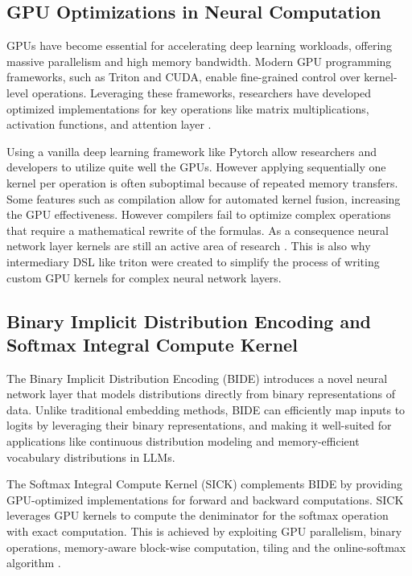 \documentclass{article}
\begin{document}
\subsection{GPU Optimizations in Neural Computation}
GPUs have become essential for accelerating deep learning workloads, offering massive parallelism and high memory bandwidth. Modern GPU programming frameworks, such as Triton and CUDA, enable fine-grained control over kernel-level operations. Leveraging these frameworks, researchers have developed optimized implementations for key operations like matrix multiplications, activation functions, and attention layer \cite{dao2022flashattention}.

Using a vanilla deep learning framework like Pytorch \cite{paszke2019pytorch} allow researchers and developers to utilize quite well the GPUs. However applying sequentially one kernel per operation is often suboptimal because of repeated memory transfers. Some features such as compilation allow for automated kernel fusion, increasing the GPU effectiveness. However compilers fail to optimize complex operations that require a mathematical rewrite of the formulas. As a consequence neural network layer kernels are still an active area of research \cite{dao2022flashattention} \cite{dao2023flashattention2}\cite{shah2024flashattention3}\cite{gu2024mamba}.
This is also why intermediary DSL like triton \cite{tillet2019triton} were created to simplify the process of writing custom GPU kernels for complex neural network layers.

\subsection{Binary Implicit Distribution Encoding and Softmax Integral Compute Kernel}
The Binary Implicit Distribution Encoding (BIDE) introduces a novel neural network layer that models distributions directly from binary representations of data. Unlike traditional embedding methods, BIDE can efficiently map inputs to logits by leveraging their binary representations, and making it well-suited for applications like continuous distribution modeling and memory-efficient vocabulary distributions in LLMs.

The Softmax Integral Compute Kernel (SICK) complements BIDE by providing GPU-optimized implementations for forward and backward computations. SICK leverages GPU kernels to compute the deniminator for the softmax operation with exact computation. This is achieved by exploiting GPU parallelism, binary operations, memory-aware block-wise computation, tiling and the online-softmax algorithm \cite{milakov2018onlinesoftmax}.
\end{document}
